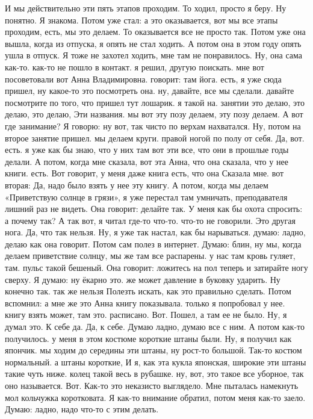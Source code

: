 И мы действительно эти пять этапов проходим.
То ходил, просто я беру.
Ну понятно.
Я знакома.
Потом уже стал: а это оказывается, вот мы все этапы проходим, есть, мы это делаем.
То оказывается все не просто так.
Потом уже она вышла, когда из отпуска, я опять не стал ходить.
А потом она в этом году опять ушла в отпуск.
Я тоже не захотел ходить, мне там не понравилось.
Ну, она сама как-то.
как-то не пошло в контакт.
я решил, другую поискать. мне вот посоветовали вот Анна Владимировна.
говорит: там йога.
есть, я уже сюда пришел, ну какое-то это посмотреть она. ну, давайте, все мы сделали. давайте посмотрите по того, что пришел тут лошарик.
я такой на.
занятии это делаю, это делаю, это делаю, Эти названия. мы вот эту позу делаем, эту позу делаем. А вот где занимание? Я говорю: ну вот, так чисто по верхам нахватался. Ну, потом на второе занятие пришел.
мы делаем круги.
правой ногой по полу от себя. Да, вот.
есть. я уже как бы знаю, что у них там вот эти все, что они в прошлые годы делали. А потом, когда мне сказала, вот эта Анна, что она сказала,
что у нее книги.
есть.
Вот говорит, у меня даже книга есть, что она Сказала мне. вот вторая:
Да, надо было взять у нее эту книгу.
А потом, когда мы делаем «Приветствую солнце в грязи», я уже перестал там умничать, преподавателя лишний раз не видеть.
Она говорит: делайте так.
У меня как бы охота спросить: а почему так?
А так вот, я читал где-то что-то.
что-то не говорили. Это другая нога.
Да, что так нельзя. Ну, я уже так настал, как бы нарываться. думаю: ладно, делаю как она говорит. Потом сам полез в интернет. Думаю: блин, ну мы, когда делаем приветствие солнцу, мы же там все распарены.
у нас там кровь гуляет, там.
пульс такой бешеный. Она говорит: ложитесь на пол теперь и затирайте ногу сверху.
Я думаю: ну ёкарно это.
же может давление в буковку ударить. Ну конечно так. так же нельзя Полезть искать, как это правильно сделать. Потом вспомнил:
а мне же это Анна книгу показывала.
только я попробовал у нее.
книгу взять может, там это.
расписано.
Вот.
Пошел, а там ее не было.
Ну, я думал это.
К себе да.
Да, к себе.
Думаю ладно, думаю все с ним.
А потом как-то получилось. у меня в этом костюме короткие штаны были.
Ну, я получил как япончик. мы ходим до середины эти штаны, ну рост-то большой.
Так-то костюм нормальный.
а штаны короткие, И я, как эта кукла японская, широкие эти штаны такие чуть ниже.
колец такой весь в рубашке. ну, вот, это такое все уборное, так оно называется.
Вот.
Как-то это неказисто выглядело.
Мне пыталась намекнуть мол кольчужка коротковата.
Я как-то внимание обратил, потом меня как-то заело.
Думаю: ладно, надо что-то с этим делать.
